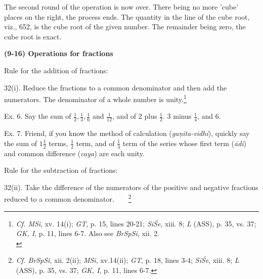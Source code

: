 \documentclass[10pt, openany]{book}
\begin{document}
{{{{{{{{{{{{{{{{{{{{\begin{sloppypar}
The second round of the operation is now over. There being no
more 'cube' places on the right, the process ends. The quantity in the
line
of the cube root, viz., 652, is the cube root of the given number. The
remainder being zero, the cube root is exact.


\newpage

\begin{center}  \textbf{(9-16) Operations for fractions} \end{center}

\noindent Rule for the addition of fractions:
\vspace{3mm}

 32(i). Reduce the fractions to a common denominator
and then add the numerators. The denominator of a whole
number is unity.\renewcommand{\thefootnote}{1}\footnote{\hspace{-2mm} \en \textit{Cf. MSi}, xv. 14(i); \textit{GT}, p. 15, lines 20-21;
\textit{SiŚe}, xiii. 8; \textit{L}
(ASS), p. 35, vs. 37; \textit{GK, I}, p. 11, lines 6-7. Also see \textit{BrSpSi},
xii. 2.\\}
\vspace{3mm}

Ex. 6. Say the sum of $\frac{1}{2}, \frac{1}{3}, \frac{1}{6}$ and $\frac{1}{12}$, and  of  2 plus $\frac{1}{2}$.
3 minus $\frac{1}{4}$, and 6.
\vspace{4mm}

 Ex. 7. Friend, if you know the method of calculation
(\textit{gaṇita-vidhi}), quickly say the sum of $1 \frac{1}{2}$ terms, $\frac{1}{2}$ term, and
of
$\frac{1}{3}$ term of the series whose first term (\textit{ādi}) and common
difference (\textit{caya}) are each unity.
\vspace{3mm}

\noindent Rule for the subtraction of fractions:
\vspace{3mm}

 32(ii). Take the difference of the numerators of the
positive and negative fractions reduced to a common denominator.~~~~\renewcommand{\thefootnote}{\hspace{-4.5mm} 2}\footnote{\hspace{-2mm} \en \textit{Cf. BrSpSi}, xii. 2(ii); \textit{MSi}, xv.14(ii); \textit{GT}, p. 18, lines
3-4;
\textit{SiŚe}, xiii. 8; \textit{L} (ASS), p. 35, vs. 37; \textit{GK, I}, p. 11, lines 6-7.}
\vspace{3mm}


\end{sloppypar}}}}}}}}}}}}}}}}}}}}}
\end{document}

